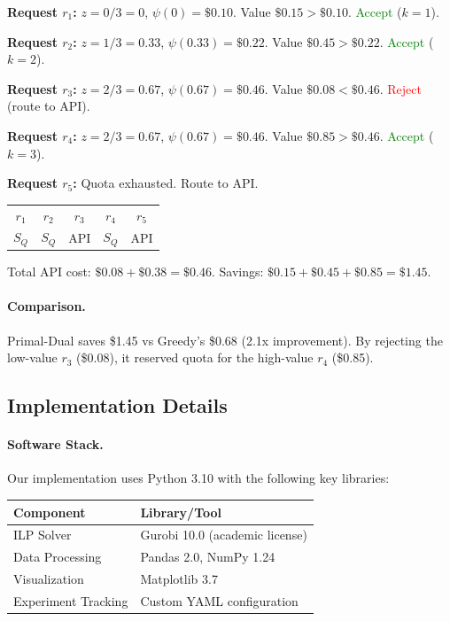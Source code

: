 \textbf{Request $r_1$:} $z = 0/3 = 0$, $\psi(0) = \$0.10$. Value $\$0.15 > \$0.10$. \textcolor{green}{Accept} ($k=1$).

\textbf{Request $r_2$:} $z = 1/3 = 0.33$, $\psi(0.33) = \$0.22$. Value $\$0.45 > \$0.22$. \textcolor{green}{Accept} ($k=2$).

\textbf{Request $r_3$:} $z = 2/3 = 0.67$, $\psi(0.67) = \$0.46$. Value $\$0.08 < \$0.46$. \textcolor{red}{Reject} (route to API).

\textbf{Request $r_4$:} $z = 2/3 = 0.67$, $\psi(0.67) = \$0.46$. Value $\$0.85 > \$0.46$. \textcolor{green}{Accept} ($k=3$).

\textbf{Request $r_5$:} Quota exhausted. Route to API.

\begin{center}
\begin{tabular}{ccccc}
$r_1$ & $r_2$ & $r_3$ & $r_4$ & $r_5$ \\
$S_Q$ & $S_Q$ & API & $S_Q$ & API \\
\end{tabular}
\end{center}
Total API cost: $\$0.08 + \$0.38 = \$0.46$. Savings: $\$0.15 + \$0.45 + \$0.85 = \$1.45$.

\paragraph{Comparison.}
Primal-Dual saves \$1.45 vs Greedy's \$0.68 (2.1x improvement). By rejecting the low-value $r_3$ (\$0.08), it reserved quota for the high-value $r_4$ (\$0.85).

\subsection{Implementation Details}
\label{app:implementation}

\paragraph{Software Stack.}
Our implementation uses Python 3.10 with the following key libraries:
\begin{center}
\begin{tabular}{ll}
\toprule
Component & Library/Tool \\
\midrule
ILP Solver & Gurobi 10.0 (academic license) \\
Data Processing & Pandas 2.0, NumPy 1.24 \\
Visualization & Matplotlib 3.7 \\
Experiment Tracking & Custom YAML configuration \\
\bottomrule
\end{tabular}
\end{center}

